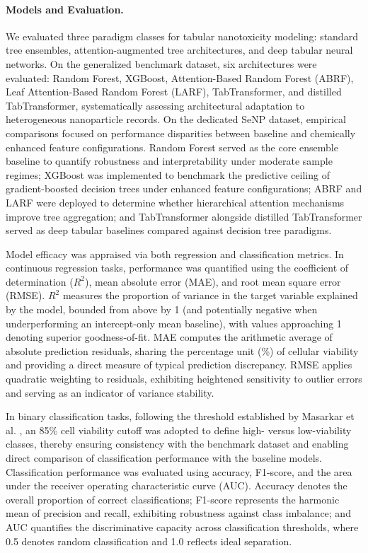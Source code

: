 \documentclass[letterpaper]{article}
\begin{document}
\paragraph{Models and Evaluation.}
We evaluated three paradigm classes for tabular nanotoxicity modeling: standard tree ensembles, attention-augmented tree architectures, and deep tabular neural networks. On the generalized benchmark dataset, six architectures were evaluated: Random Forest, XGBoost, Attention-Based Random Forest (ABRF), Leaf Attention-Based Random Forest (LARF), TabTransformer, and distilled TabTransformer, systematically assessing architectural adaptation to heterogeneous nanoparticle records. On the dedicated SeNP dataset, empirical comparisons focused on performance disparities between baseline and chemically enhanced feature configurations. Random Forest served as the core ensemble baseline to quantify robustness and interpretability under moderate sample regimes; XGBoost was implemented to benchmark the predictive ceiling of gradient-boosted decision trees under enhanced feature configurations; ABRF and LARF were deployed to determine whether hierarchical attention mechanisms improve tree aggregation; and TabTransformer alongside distilled TabTransformer served as deep tabular baselines compared against decision tree paradigms.

Model efficacy was appraised via both regression and classification metrics. In continuous regression tasks, performance was quantified using the coefficient of determination ($R^2$), mean absolute error (MAE), and root mean square error (RMSE). $R^2$ measures the proportion of variance in the target variable explained by the model, bounded from above by 1 (and potentially negative when underperforming an intercept-only mean baseline), with values approaching 1 denoting superior goodness-of-fit. MAE computes the arithmetic average of absolute prediction residuals, sharing the percentage unit (\%) of cellular viability and providing a direct measure of typical prediction discrepancy. RMSE applies quadratic weighting to residuals, exhibiting heightened sensitivity to outlier errors and serving as an indicator of variance stability.

In binary classification tasks, following the threshold established by Masarkar et al. \cite{masarkar2024}, an 85\% cell viability cutoff was adopted to define high- versus low-viability classes, thereby ensuring consistency with the benchmark dataset and enabling direct comparison of classification performance with the baseline models. Classification performance was evaluated using accuracy, F1-score, and the area under the receiver operating characteristic curve (AUC). Accuracy denotes the overall proportion of correct classifications; F1-score represents the harmonic mean of precision and recall, exhibiting robustness against class imbalance; and AUC quantifies the discriminative capacity across classification thresholds, where 0.5 denotes random classification and 1.0 reflects ideal separation.
\end{document}
